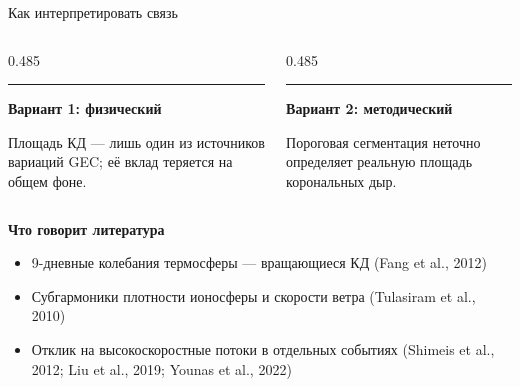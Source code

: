 \documentclass[aspectratio=169,11pt]{beamer}
\newcommand{\key}[1]{{\color{deep}\bfseries#1}}
\begin{document}
\begin{frame}[t]{Как интерпретировать связь}
\begin{columns}[T,onlytextwidth]
\begin{column}[T]{0.485\textwidth}
  {\color{sun}\rule{\linewidth}{1.4pt}}\par\vspace{1.6mm}
  {\bfseries Вариант 1: физический}\par\vspace{0.8mm}
  {\footnotesize\color{muted}Площадь КД --- лишь один из источников
   вариаций GEC; её вклад теряется на общем фоне.}
\end{column}
\begin{column}[T]{0.485\textwidth}
  {\color{teal}\rule{\linewidth}{1.4pt}}\par\vspace{1.6mm}
  {\bfseries Вариант 2: методический}\par\vspace{0.8mm}
  {\footnotesize\color{muted}Пороговая сегментация неточно определяет
   реальную площадь корональных дыр.}
\end{column}
\end{columns}

\vspace{4mm}
{\small\key{Что говорит литература}}\par\vspace{1.2mm}
{\footnotesize
\begin{itemize}
  \item 9-дневные колебания термосферы --- вращающиеся КД
        (Fang et al., 2012)
  \item Субгармоники плотности ионосферы и скорости ветра
        (Tulasiram et al., 2010)
  \item Отклик на высокоскоростные потоки в отдельных событиях
        (Shimeis et al., 2012; Liu et al., 2019; Younas et al., 2022)
\end{itemize}}
\vspace{1mm}
{\scriptsize\color{muted}}
\end{frame}
\end{document}
